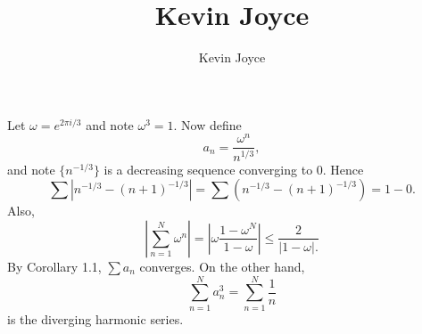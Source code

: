\documentclass{homework}
\title{Kevin Joyce}
\author{Kevin Joyce}
\begin{document}
 
\newcommand{\figref}[1]{\figurename~\ref{#1}}
\renewcommand{\bar}{\overline}
\renewcommand{\hat}{\widehat}
\renewcommand{\SS}{\mathcal S}
\newcommand{\eps}{\varepsilon}
\newcommand{\TTheta}{\overline{\underline \Theta} }
\newcommand{\del}{\partial}
\newcommand{\approxsim}{\overset{\cdotp}{\underset{\cdotp}{\sim}}}

\begin{solution}
  Let $\omega = e^{2\pi i/3 }$ and note $\omega^3 = 1$. Now define
  $$
    a_n = \frac{\omega^n}{n^{1/3}},
  $$
  and note $\{n^{-1/3}\}$ is a decreasing sequence converging to 0. Hence 
  $$\sum|n^{-1/3} - (n+1)^{-1/3}| = \sum(n^{-1/3} - (n+1)^{-1/3}) = 1 - 0.$$ Also, 
  $$
    \left|\sum_{n=1}^N \omega^n\right| = \left|\omega\frac{1-\omega^N}{1-\omega}\right| \le \frac{2}{|1-\omega|.}
  $$
  By Corollary 1.1, $\sum a_n$ converges.  On the other hand, 
  $$
    \sum_{n=1}^N a_n^3 = \sum_{n=1}^N \frac{1}{n}
  $$
  is the diverging harmonic series.
\end{solution}
\end{document}
